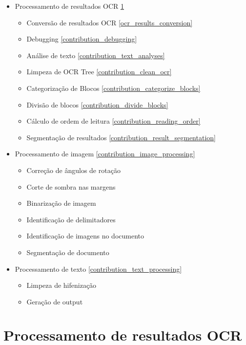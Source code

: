 \begin{itemize}\setlength\itemsep{-0.3em}
	
	\item Processamento de resultados OCR \ref{contribution_ocr_posprocessing}
	
	\begin{itemize}\setlength\itemsep{-0.3em}
		\item Conversão de resultados OCR \ref{ocr_results_conversion}
		\item Debugging \ref{contribution_debugging}
		\item Análise de texto \ref{contribution_text_analyses}
		\item Limpeza de OCR Tree \ref{contribution_clean_ocr}
		\item Categorização de Blocos \ref{contribution_categorize_blocks}
		\item Divisão de blocos \ref{contribution_divide_blocks}
		\item Cálculo de ordem de leitura \ref{contribution_reading_order}
		\item Segmentação de resultados \ref{contribution_result_segmentation}
	\end{itemize}
	
	\item Processamento de imagem \ref{contribution_image_processing}
	\begin{itemize}\setlength\itemsep{-0.3em}
		\item Correção de ângulos de rotação
		\item Corte de sombra nas margens
		\item Binarização de imagem
		\item Identificação de delimitadores
		\item Identificação de imagens no documento
		\item Segmentação de documento
	\end{itemize}
	
	\item Processamento de texto \ref{contribution_text_processing}
	\begin{itemize}\setlength\itemsep{-0.3em}
		\item Limpeza de hifenização
		\item Geração de output
	\end{itemize}
		
		
\end{itemize}


\section{Processamento de resultados OCR}
\label{contribution_ocr_posprocessing}


